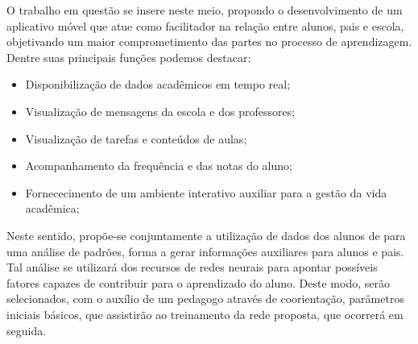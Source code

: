 O trabalho em questão se insere neste meio, propondo o desenvolvimento de um aplicativo móvel que atue como facilitador na relação entre alunos, pais e escola, objetivando um maior comprometimento das partes no processo de aprendizagem. Dentre suas principais funções podemos destacar:
\begin{itemize}
	\item Disponibilização de dados acadêmicos em tempo real;
	\item Visualização de mensagens da escola e dos professores;
	\item Visualização de tarefas e conteúdos de aulas;
	\item Acompanhamento da frequência e das notas do aluno;
	\item Fornececimento de um ambiente interativo auxiliar para a gestão da vida acadêmica;
\end{itemize}

Neste sentido, propõe-se conjuntamente a utilização de dados dos alunos de para uma análise de padrões, forma a gerar informações auxiliares para alunos e pais. Tal análise se utilizará dos recursos de redes neurais para apontar possíveis fatores capazes de contribuir para o aprendizado do aluno. Deste modo, serão selecionados, com o auxílio de um pedagogo através de coorientação,  parâmetros iniciais básicos, que assistirão ao treinamento da rede proposta, que ocorrerá em seguida.